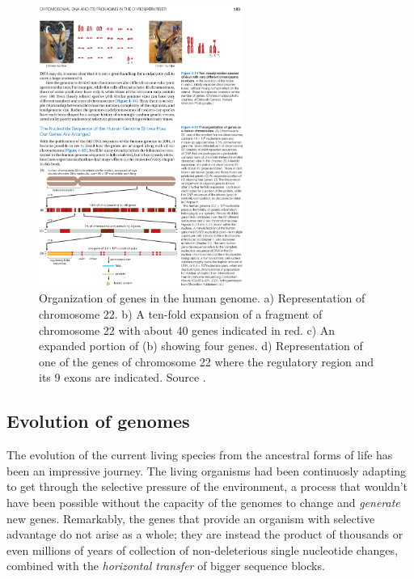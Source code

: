 \begin{figure}[h]
	\begin{minipage}[b]{\linewidth}
	  \centering
	  \includegraphics*[width=0.6\textwidth]{figures/chap1_genes_full}
	  \caption{Organization of genes in the human genome. a)
       Representation of chromosome 22. b) A ten-fold expansion of a
       fragment of chromosome 22 with about 40 genes indicated in
       red. c) An expanded portion of (b) showing four genes. d)
       Representation of one of the genes of chromosome 22 where the
       regulatory region and its 9 exons are indicated. Source
       \cite{alberts}.} 
	  \label{fig:chap1:genes}
   \end{minipage}
\end{figure}

\subsection{Evolution of genomes}
\label{sec:chap1:genome-evolution}

The evolution of the current living species from the ancestral forms
of life has been an impressive journey. The living organisms had been
continuosly adapting to get through the selective pressure of the
environment, a process that wouldn't have been possible without the
capacity of the genomes to change and {\em generate} new
genes. Remarkably, the genes that provide  an organism with selective
advantage do not arise as a whole; they are instead the product of
thousands or even millions of years of collection of non-deleterious
single nucleotide changes, combined with the {\em horizontal transfer} of
bigger sequence blocks. 

